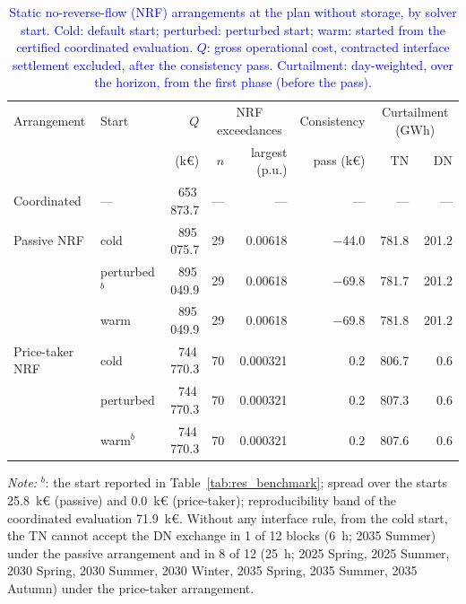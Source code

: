 \begin{table}[htbp!]
    \centering
    \caption{\textcolor{blue}{Static no-reverse-flow (NRF) arrangements at the plan without storage, by solver start. Cold: default start; perturbed: perturbed start; warm: started from the certified coordinated evaluation. $Q$: gross operational cost, contracted interface settlement excluded, after the consistency pass. Curtailment: day-weighted, over the horizon, from the first phase (before the pass).}}
    \label{tab:appE_benchmark}
    \scriptsize\setlength{\tabcolsep}{4pt}
    \begin{tabular}{l l r r r r r r}
        \toprule
        Arrangement & Start & $Q$ & \multicolumn{2}{c}{NRF exceedances} & Consistency & \multicolumn{2}{c}{Curtailment (GWh)} \\
        \cmidrule(lr){4-5}\cmidrule(l){7-8}
         & & (k\euro) & $n$ & largest (p.u.) & pass (k\euro) & TN & DN \\
        \midrule
        Coordinated & --- & 653\,873.7 & --- & --- & --- & --- & --- \\
        \midrule
        Passive NRF & cold & 895\,075.7 & 29 & 0.00618 & $-$44.0 & 781.8 & 201.2 \\
         & perturbed$^{b}$ & 895\,049.9 & 29 & 0.00618 & $-$69.8 & 781.7 & 201.2 \\
         & warm & 895\,049.9 & 29 & 0.00618 & $-$69.8 & 781.8 & 201.2 \\
        \midrule
        Price-taker NRF & cold & 744\,770.3 & 70 & 0.000321 & 0.2 & 806.7 & 0.6 \\
         & perturbed & 744\,770.3 & 70 & 0.000321 & 0.2 & 807.3 & 0.6 \\
         & warm$^{b}$ & 744\,770.3 & 70 & 0.000321 & 0.2 & 807.6 & 0.6 \\
        \bottomrule
    \end{tabular}
    \par\smallskip
    \begin{minipage}{0.95\linewidth}
        \scriptsize\raggedright
        \textit{Note:} $^{b}$: the start reported in Table~\ref{tab:res_benchmark}; spread over the starts 25.8~k\euro{} (passive) and 0.0~k\euro{} (price-taker); reproducibility band of the coordinated evaluation 71.9~k\euro{}. Without any interface rule, from the cold start, the TN cannot accept the DN exchange in 1 of 12 blocks (6~h; 2035 Summer) under the passive arrangement and in 8 of 12 (25~h; 2025 Spring, 2025 Summer, 2030 Spring, 2030 Summer, 2030 Winter, 2035 Spring, 2035 Summer, 2035 Autumn) under the price-taker arrangement.
    \end{minipage}
\end{table}

